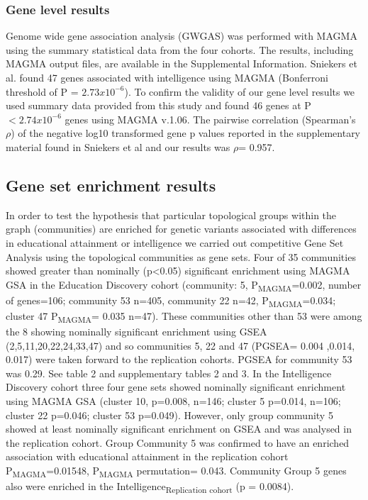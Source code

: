 \subsubsection{Gene level results}

Genome wide gene association analysis (GWGAS) was performed with MAGMA using the summary statistical data from the four cohorts. The results, including MAGMA output files, are available in the Supplemental Information.
Sniekers et al. found 47 genes associated with intelligence using MAGMA (Bonferroni threshold of P = $2.73 x 10^{-6}$). \cite{sniekers2017genome}  To confirm the validity of our gene level results we used summary data provided from this study and found 46 genes at  P$<2.74 x 10^{-6}$ genes using MAGMA v.1.06.  The pairwise correlation (Spearman’s $\rho$) of the negative log10 transformed gene p values reported in the supplementary material found in Sniekers et al and our results was $\rho$= 0.957. \cite{sniekers2017genome} 



\subsection{Gene set enrichment results}
In order to test the hypothesis that particular topological groups within the graph (communities) are enriched for genetic variants associated with differences in educational attainment or intelligence we carried out competitive Gene Set Analysis using the topological communities as gene sets. 
Four of 35 communities showed greater than nominally (p<0.05) significant enrichment using MAGMA GSA in the Education Discovery cohort (community: 5, P\textsubscript{MAGMA}=0.002, number of genes=106; community 53 n=405, community 22 n=42, P\textsubscript{MAGMA}=0.034; cluster 47 P\textsubscript{MAGMA}= 0.035 n=47). These communities other than 53 were among the 8 showing nominally significant enrichment using GSEA (2,5,11,20,22,24,33,47) and so communities 5, 22 and 47 (PGSEA= 0.004 ,0.014, 0.017) were taken forward to the replication cohorts. PGSEA for community 53 was 0.29. See table 2 and supplementary tables 2 and 3.
In the Intelligence Discovery cohort three four gene sets showed nominally significant enrichment using MAGMA GSA (cluster 10, p=0.008, n=146; cluster 5 p=0.014, n=106; cluster 22 p=0.046; cluster 53 p=0.049). However, only group community 5 showed at least nominally significant enrichment on GSEA and was analysed in the replication cohort. 
Group Community 5 was confirmed to have an enriched association with educational attainment in the replication cohort P\textsubscript{MAGMA}=0.01548, P\textsubscript{MAGMA} permutation= 0.043. Community Group 5 genes also were enriched in the Intelligence\textsubscript{Replication cohort} (p = 0.0084).

